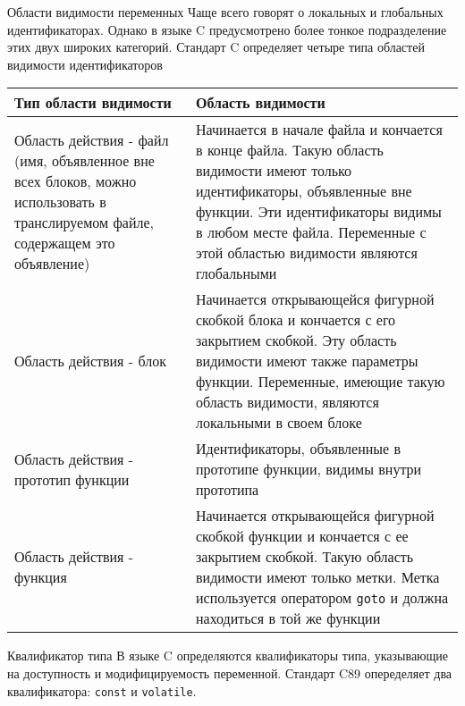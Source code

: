 \documentclass[xcolor=table]{beamer}
\begin{document}
\begin{frame}{Области видимости переменных}
    Чаще всего говорят о локальных и глобальных идентификаторах. Однако в языке C предусмотрено более тонкое подразделение этих двух широких категорий. Стандарт C определяет четыре типа областей видимости идентификаторов
    {
    {\small
        \begin{center}
            \begin{tabular}{ |p{4cm}|p{7cm}| } 
                \hline
                \rowcolor{red!60!}
                Тип области видимости & Область видимости \\ \hline
                 Область действия - файл (имя, объявленное вне всех блоков, можно использовать в транслируемом файле, содержащем это объявление)
                 &
                 Начинается в начале файла и кончается в конце файла. Такую область видимости имеют только идентификаторы, объявленные вне функции. Эти идентификаторы видимы в любом месте файла. Переменные с этой областью видимости являются глобальными
                 \\ \hline
                Область действия - блок &
                Начинается открывающейся фигурной скобкой блока и кончается с его закрытием скобкой. Эту область видимости имеют также параметры функции. Переменные, имеющие такую область видимости, являются локальными в своем блоке\\ \hline
                Область действия - прототип функции &
                Идентификаторы, объявленные в прототипе функции, видимы внутри прототипа \\ \hline
                Область действия - функция &
                Начинается открывающейся фигурной скобкой функции и кончается с ее закрытием скобкой. Такую область видимости имеют только метки. Метка используется оператором \texttt{goto} и должна находиться в той же функции \\ \hline
            \end{tabular}
        \end{center}
    }}
 
\end{frame}

\begin{frame}{Квалификатор типа}
    В языке C определяются квалификаторы типа, указывающие на доступность и модифицируемость переменной. Стандарт C89 опеределяет два квалификатора: \texttt{const} и \texttt{volatile}.
\end{frame}
\end{document}
